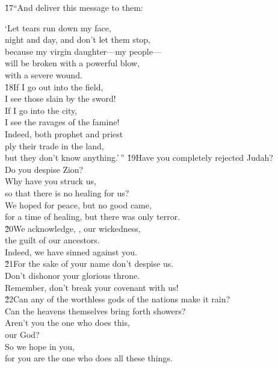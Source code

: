 \v{17}``And deliver this message to them:

\begin{poetry}
\poeml `Let tears run down my face, \\
\poemll    night and day, and don't let them stop, \\
\poeml because my virgin daughter---my people--- \\
\poemll    will be broken with a powerful blow, \\
\poemlll       with a severe wound. \\
\poeml \v{18}If I go out into the field, \\
\poemll    I see those slain by the sword! \\
\poeml If I go into the city, \\
\poemll    I see the ravages of the famine! \\
\poeml Indeed, both prophet and priest \\
\poemll    ply their trade in the land, \\
\poemlll       but they don't know anything.'\,''
\poeml \v{19}Have you completely rejected Judah? \\
\poemll    Do you despise Zion? \\
\poeml Why have you struck us, \\
\poemll    so that there is no healing for us? \\
\poeml We hoped for peace, but no good came, \\
\poemll    for a time of healing, but there was only terror. \\
\poeml \v{20}We acknowledge, , our wickedness, \\
\poemll    the guilt of our ancestors. \\
\poeml Indeed, we have sinned against you. \\
\poeml \v{21}For the sake of your name don't despise us. \\
\poemll    Don't dishonor your glorious throne. \\
\poemlll       Remember, don't break your covenant with us! \\
\poeml \v{22}Can any of the worthless gods of the nations make it rain? \\
\poemll    Can the heavens themselves bring forth showers? \\
\poeml Aren't you the one who does this, \\
\poemll    {} our God? \\
\poeml So we hope in you, \\
\poemll    for you are the one who does all these things.
\end{poetry}

